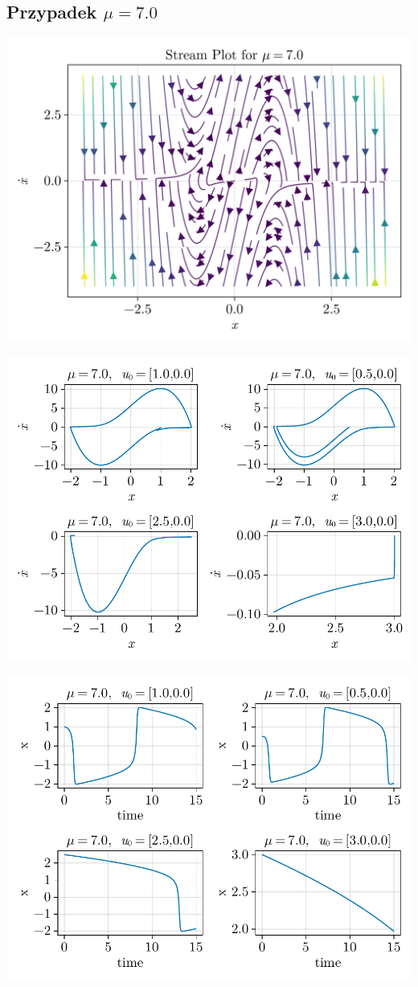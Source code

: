 \clearpage

%
%
\subsection{Przypadek $\mu = 7.0$}
\includegraphics[width=\textwidth]{out/stream_12.png}

\includegraphics[width=\textwidth]{out/phase_12.pdf}

\includegraphics[width=\textwidth]{out/xfromt_12.pdf}


